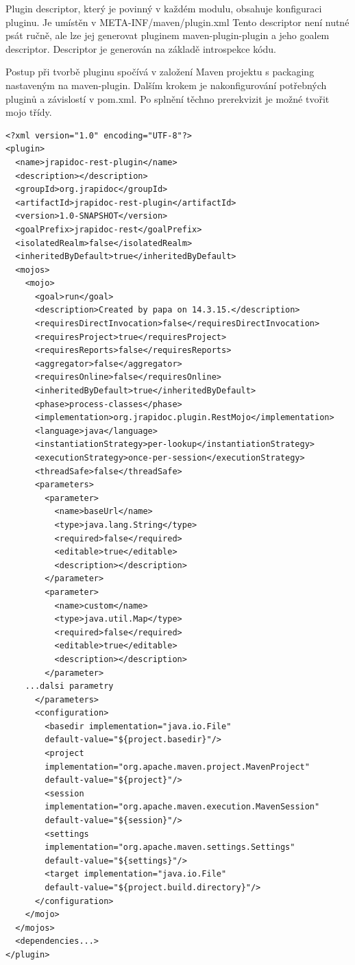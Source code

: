 \documentclass[11pt,twoside,a4paper]{book}
\begin{document}
Plugin descriptor, který je povinný v každém modulu, obsahuje konfiguraci pluginu. Je
umístěn v META-INF/maven/plugin.xml Tento descriptor není nutné psát ručně, ale lze jej
generovat pluginem maven-plugin-plugin a jeho goalem descriptor. Descriptor je generován
na základě introspekce kódu.

Postup při tvorbě pluginu spočívá v založení Maven projektu s packaging nastaveným na
maven-plugin. Dalším krokem je nakonfigurování potřebných pluginů a závislostí v pom.xml.
Po splnění těchno prerekvizit je možné tvořit mojo třídy.

\begin{lstlisting}[frame=single]
<?xml version="1.0" encoding="UTF-8"?>
<plugin>
  <name>jrapidoc-rest-plugin</name>
  <description></description>
  <groupId>org.jrapidoc</groupId>
  <artifactId>jrapidoc-rest-plugin</artifactId>
  <version>1.0-SNAPSHOT</version>
  <goalPrefix>jrapidoc-rest</goalPrefix>
  <isolatedRealm>false</isolatedRealm>
  <inheritedByDefault>true</inheritedByDefault>
  <mojos>
    <mojo>
      <goal>run</goal>
      <description>Created by papa on 14.3.15.</description>
      <requiresDirectInvocation>false</requiresDirectInvocation>
      <requiresProject>true</requiresProject>
      <requiresReports>false</requiresReports>
      <aggregator>false</aggregator>
      <requiresOnline>false</requiresOnline>
      <inheritedByDefault>true</inheritedByDefault>
      <phase>process-classes</phase>
      <implementation>org.jrapidoc.plugin.RestMojo</implementation>
      <language>java</language>
      <instantiationStrategy>per-lookup</instantiationStrategy>
      <executionStrategy>once-per-session</executionStrategy>
      <threadSafe>false</threadSafe>
      <parameters>
        <parameter>
          <name>baseUrl</name>
          <type>java.lang.String</type>
          <required>false</required>
          <editable>true</editable>
          <description></description>
        </parameter>
        <parameter>
          <name>custom</name>
          <type>java.util.Map</type>
          <required>false</required>
          <editable>true</editable>
          <description></description>
        </parameter>
    ...dalsi parametry
      </parameters>
      <configuration>
        <basedir implementation="java.io.File" 
        default-value="${project.basedir}"/>
        <project 
        implementation="org.apache.maven.project.MavenProject" 
        default-value="${project}"/>
        <session 
        implementation="org.apache.maven.execution.MavenSession" 
        default-value="${session}"/>
        <settings 
        implementation="org.apache.maven.settings.Settings" 
        default-value="${settings}"/>
        <target implementation="java.io.File" 
        default-value="${project.build.directory}"/>
      </configuration>
    </mojo>
  </mojos>
  <dependencies...>
</plugin>
\end{lstlisting}
\end{document}
